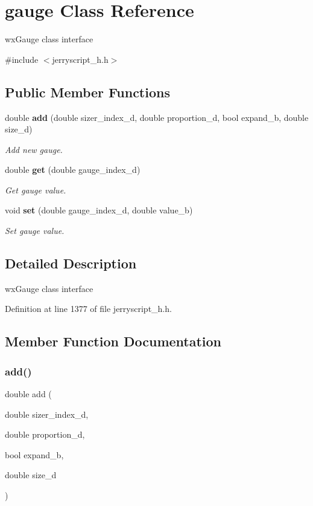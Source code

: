 \section{gauge Class Reference}
\label{classgauge}


wx\+Gauge class interface  




{\ttfamily \#include $<$jerryscript\+\_\+h.\+h$>$}

\subsection*{Public Member Functions}
\begin{DoxyCompactItemize}
\item 
double \textbf{ add} (double sizer\+\_\+index\+\_\+d, double proportion\+\_\+d, bool expand\+\_\+b, double size\+\_\+d)
\begin{DoxyCompactList}\small\item\em Add new gauge. \end{DoxyCompactList}\item 
double \textbf{ get} (double gauge\+\_\+index\+\_\+d)
\begin{DoxyCompactList}\small\item\em Get gauge value. \end{DoxyCompactList}\item 
void \textbf{ set} (double gauge\+\_\+index\+\_\+d, double value\+\_\+b)
\begin{DoxyCompactList}\small\item\em Set gauge value. \end{DoxyCompactList}\end{DoxyCompactItemize}


\subsection{Detailed Description}
wx\+Gauge class interface 

Definition at line 1377 of file jerryscript\+\_\+h.\+h.



\subsection{Member Function Documentation}
\mbox{\label{classgauge_a7204c33db14bd49c561cd715852bf331}} 
\subsubsection{add()}
{\footnotesize\ttfamily double add (\begin{DoxyParamCaption}\item[{double}]{sizer\+\_\+index\+\_\+d,  }\item[{double}]{proportion\+\_\+d,  }\item[{bool}]{expand\+\_\+b,  }\item[{double}]{size\+\_\+d }\end{DoxyParamCaption})}



